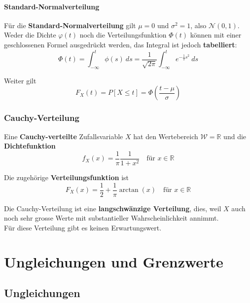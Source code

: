 \documentclass[11pt]{article}
\begin{document}
\paragraph{Standard-Normalverteilung}

Für die \textbf{Standard-Normalverteilung} gilt $\mu = 0$ und $\sigma^2 = 1$, also $\mathcal{N}(0,1)$. Weder die Dichte $\varphi(t)$ noch die Verteilungsfunktion $\Phi(t)$ können mit einer geschlossenen Formel ausgedrückt werden, das Integral ist jedoch \textbf{tabelliert}:
\begin{equation*}
	\Phi(t) = \int_{-\infty}^t \phi(s)\ ds = \frac{1}{\sqrt{2\pi}}\int_{-\infty}^t e^{-\frac{1}{2}s^2}\ ds
\end{equation*}

Weiter gilt
\begin{equation*}
	F_X(t) = P[X \leq t] = \Phi(\frac{t-\mu}{\sigma})
\end{equation*}

\subsubsection{Cauchy-Verteilung}

Eine \textbf{Cauchy-verteilte} Zufallsvariable $X$ hat den Wertebereich $\mathcal{W} = \mathbb{R}$ und die \textbf{Dichtefunktion}
\begin{equation*}
	f_X(x) = \frac{1}{\pi}\frac{1}{1+x^2}\quad\text{für }x \in \mathbb{R}
\end{equation*}

Die zugehörige \textbf{Verteilungsfunktion} ist 
\begin{equation*}
	F_X(x) = \frac{1}{2}+\frac{1}{\pi}\arctan(x)\quad\text{für }x \in \mathbb{R}
\end{equation*}

Die Cauchy-Verteilung ist eine \textbf{langschwänzige Verteilung}, dies, weil $X$ auch noch sehr grosse Werte mit substantieller Wahrscheinlichkeit annimmt. \\
Für diese Verteilung gibt es keinen Erwartungswert.

\section{Ungleichungen und Grenzwerte}

\subsection{Ungleichungen}
\end{document}
